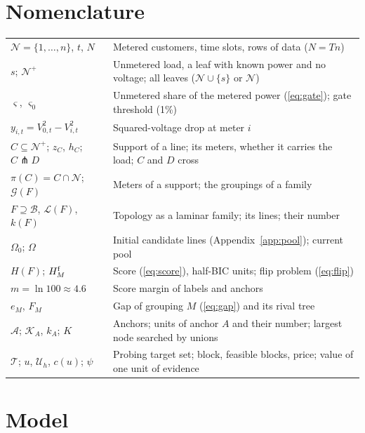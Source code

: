 \documentclass[journal,onecolumn,11pt]{IEEEtran}
\newcommand{\Lin}{\mathcal{L}}
\newcommand{\Nset}{\mathcal{N}}
\newcommand{\Bset}{\mathcal{B}}
\newcommand{\Tset}{\mathcal{T}}
\newcommand{\Uset}{\mathcal{U}}
\newcommand{\Aset}{\mathcal{A}}
\newcommand{\Kset}{\mathcal{K}}
\newcommand{\Gset}{\mathcal{G}}
\newcommand{\cross}{\pitchfork}
\begin{document}
\section*{Nomenclature}
\begin{tabular}{@{}p{}p{}@{}}
\toprule
$\Nset=\{1,\dots,n\}$, $t$, $N$ & Metered customers, time slots, rows of data ($N=Tn$)\\
$s$; $\Nset^+$ & Unmetered load, a leaf with known power and no voltage; all leaves ($\Nset\cup\{s\}$ or $\Nset$)\\
$\varsigma$, $\varsigma_0$ & Unmetered share of the metered power (\ref{eq:gate}); gate threshold (1\%)\\
$y_{i,t}=V_{0,t}^2-V_{i,t}^2$ & Squared-voltage drop at meter $i$\\
$C\subseteq\Nset^+$; $z_C$, $h_C$; $C\cross D$ & Support of a line; its meters, whether it carries the load; $C$ and $D$ cross\\
$\pi(C)=C\cap\Nset$; $\Gset(F)$ & Meters of a support; the groupings of a family\\
$F\supseteq\Bset$, $\Lin(F)$, $k(F)$ & Topology as a laminar family; its lines; their number\\
$\Omega_0$; $\Omega$ & Initial candidate lines (Appendix~\ref{app:pool}); current pool\\
$H(F)$; $H^{\rm f}_M$ & Score (\ref{eq:score}), half-BIC units; flip problem (\ref{eq:flip})\\
$m=\ln100\approx4.6$ & Score margin of labels and anchors\\
$e_M$, $F_M$ & Gap of grouping $M$ (\ref{eq:gap}) and its rival tree\\
$\Aset$; $\Kset_A$, $k_A$; $K$ & Anchors; units of anchor $A$ and their number; largest node searched by unions\\
$\Tset$; $u$, $\Uset_h$, $c(u)$; $\psi$ & Probing target set; block, feasible blocks, price; value of one unit of evidence\\
\bottomrule
\end{tabular}

\section{Model}\label{sec:model}
\end{document}
